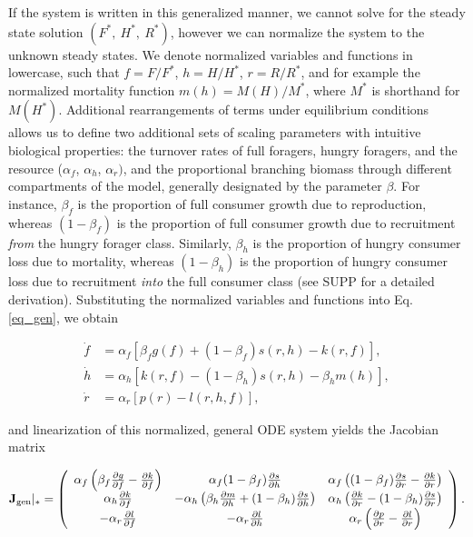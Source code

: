 \documentclass[12pt,english]{article}
\begin{document}
\begin{spacing}{1.9}
If the system is written in this generalized manner, we cannot solve for the steady state solution $(F^*,~H^*,~R^*)$, however we can normalize the system to the unknown steady states.
We denote normalized variables and functions in lowercase, such that $f = F/F^*$, $h = H/H^*$, $r = R/R^*$, and for example the normalized mortality function $m(h) = M(H)/M^*$, where $M^*$ is shorthand for $M(H^*)$.
Additional rearrangements of terms under equilibrium conditions allows us to define two additional sets of scaling parameters with intuitive biological properties: the turnover rates of full foragers, hungry foragers, and the resource ($\alpha_f$, $\alpha_h$, $\alpha_r)$, and the proportional branching biomass through different compartments of the model, generally designated by the parameter $\beta$.
For instance, $\beta_f$ is the proportion of full consumer growth due to reproduction, whereas $(1-\beta_f)$ is the proportion of full consumer growth due to recruitment \emph{from} the hungry forager class.
Similarly, $\beta_h$ is the proportion of hungry consumer loss due to mortality, whereas $(1-\beta_h)$ is the proportion of hungry consumer loss due to recruitment \emph{into} the full consumer class (see SUPP for a detailed derivation).
Substituting the normalized variables and functions into Eq. \ref{eq_gen}, we obtain

 
\begin{align}
\dot{f} &= \alpha_f \left[ \beta_f g(f) + (1-\beta_f)s(r,h) - k(r,f)\right], \nonumber \\
\dot{h} &= \alpha_h \left[ k(r,f) - (1-\beta_h)s(r,h) - \beta_h m(h) \right], \nonumber \\
\dot{r} &= \alpha_r \left[ p(r) - l(r,h,f) \right],
\label{eq_gen}
\end{align}

\noindent and linearization of this normalized, general ODE system yields the Jacobian matrix

\begin{equation}
\mathbf{J}_{\rm gen}|_* =
\left(
\begin{array}{ccc}
 \alpha_f \left(\beta_f \frac{\partial g}{\partial f} - \frac{\partial k}{\partial f} \right) & \alpha_f(1-\beta_f)\frac{\partial s}{\partial h} & \alpha_f \left( (1-\beta_f)\frac{\partial s}{\partial r} - \frac{\partial k}{\partial r} \right) \\
 \alpha_h \frac{\partial k}{\partial f} & -\alpha_h \left(\beta_h \frac{\partial m}{\partial h} + (1-\beta_h) \frac{\partial s}{\partial h} \right) & \alpha_h \left(\frac{\partial k}{\partial r} - (1 - \beta_h)\frac{\partial s}{\partial r} \right) \\
 -\alpha_r \frac{\partial l}{\partial f} & -\alpha_r \frac{\partial l}{\partial h} & \alpha_r \left( \frac{\partial p}{\partial r} - \frac{\partial l}{\partial r} \right) \\
\end{array}
\right).
\label{eq_Jacgen}
\end{equation}


\end{spacing}
\end{document}
